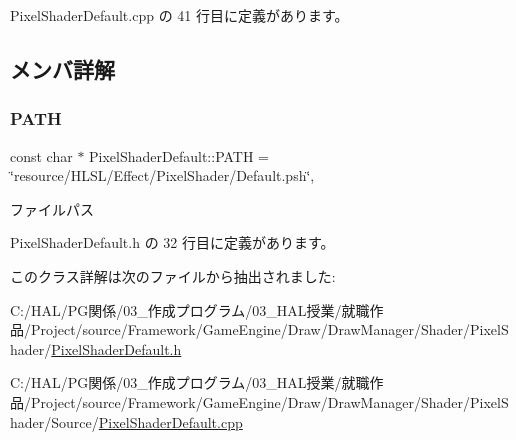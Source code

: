  Pixel\+Shader\+Default.\+cpp の 41 行目に定義があります。



\subsection{メンバ詳解}
\mbox{\label{class_pixel_shader_default_a45201e7b3035e053d0171222c324f91e}} 
\subsubsection{\texorpdfstring{P\+A\+TH}{PATH}}
{\footnotesize\ttfamily const char $\ast$ Pixel\+Shader\+Default\+::\+P\+A\+TH = \char`\"{}resource/H\+L\+SL/Effect/Pixel\+Shader/Default.\+psh\char`\"{}\hspace{0.3cm}{\ttfamily [static]}, {\ttfamily [private]}}



ファイルパス 



 Pixel\+Shader\+Default.\+h の 32 行目に定義があります。



このクラス詳解は次のファイルから抽出されました\+:\begin{DoxyCompactItemize}
\item 
C\+:/\+H\+A\+L/\+P\+G関係/03\+\_\+作成プログラム/03\+\_\+\+H\+A\+L授業/就職作品/\+Project/source/\+Framework/\+Game\+Engine/\+Draw/\+Draw\+Manager/\+Shader/\+Pixel\+Shader/\mbox{\hyperlink{_pixel_shader_default_8h}{Pixel\+Shader\+Default.\+h}}\item 
C\+:/\+H\+A\+L/\+P\+G関係/03\+\_\+作成プログラム/03\+\_\+\+H\+A\+L授業/就職作品/\+Project/source/\+Framework/\+Game\+Engine/\+Draw/\+Draw\+Manager/\+Shader/\+Pixel\+Shader/\+Source/\mbox{\hyperlink{_pixel_shader_default_8cpp}{Pixel\+Shader\+Default.\+cpp}}\end{DoxyCompactItemize}
